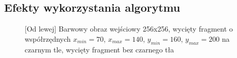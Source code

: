 \documentclass[a4paper,12pt, titlepage]{report}
\begin{document}
\subsection*{Efekty wykorzystania algorytmu}
\begin{figure}[h]
    \centering
    \caption{[Od lewej] Barwowy obraz wejściowy 256x256, wycięty fragment o współrzędnych \(x_{min}=70\), \(x_{max}=140\), \(y_{min}=160\), \(y_{max}=200\) na czarnym tle, wycięty fragment bez czarnego tła}%
    \label{fig:rysunek}%
\end{figure}
\FloatBarrier
\end{document}
